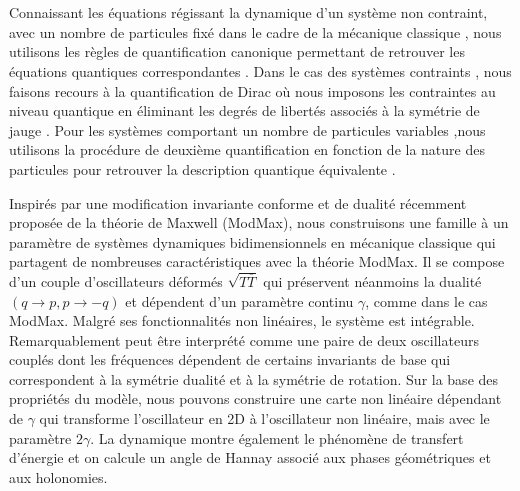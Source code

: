 \documentclass[12pt,a4paper, openany]{report}
\begin{document}
	
	
	\chapter*{\color{green!30!blue}{Résume}}
	Connaissant les équations régissant la dynamique d'un système non contraint, avec un nombre de particules fixé dans le cadre de la mécanique classique ,  nous utilisons les règles de quantification canonique permettant de retrouver les équations quantiques correspondantes .	Dans le cas des systèmes contraints , nous faisons recours à la quantification de Dirac  où nous imposons les contraintes au niveau quantique en éliminant les degrés de libertés associés à la symétrie de jauge .  Pour les systèmes comportant un nombre de particules variables ,nous utilisons la procédure de deuxième quantification en fonction de la nature des particules pour retrouver la description quantique équivalente . \par Inspirés par une modification invariante conforme et de dualité récemment proposée de la théorie de Maxwell (ModMax), nous construisons une famille à un paramètre de systèmes dynamiques bidimensionnels en mécanique classique qui partagent de nombreuses caractéristiques avec la théorie ModMax. Il se compose d'un couple d'oscillateurs déformés $\sqrt{T\overline{T}}$ qui préservent néanmoins la dualité $(q \rightarrow p, p \rightarrow -q)$ et dépendent d'un paramètre continu $\gamma$, comme dans le cas ModMax. Malgré ses fonctionnalités non linéaires, le système est intégrable. Remarquablement peut être interprété comme une paire de deux oscillateurs couplés dont les fréquences dépendent de certains invariants de base qui correspondent à la symétrie dualité et à la symétrie de rotation. Sur la base des propriétés du modèle, nous pouvons construire une carte non linéaire dépendant de $\gamma$ qui transforme l'oscillateur en 2D à l'oscillateur non linéaire, mais avec le paramètre $2\gamma$. La dynamique montre également le phénomène de transfert d'énergie et on calcule un angle de Hannay associé aux phases géométriques et aux holonomies.
	\par
	
\end{document}
